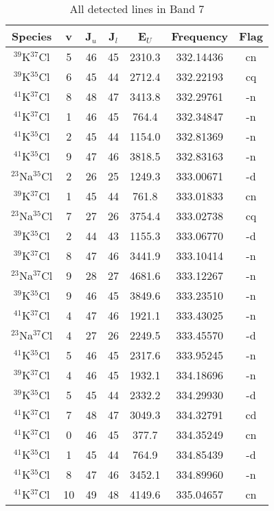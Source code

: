 \begin{table*}[htp]
\centering
\caption{All detected lines in Band 7}
\begin{tabular}{ccccccc}
\label{tab:all_detections_B7}
Species & v & J$_u$ & J$_l$ & E$_U$ & Frequency & Flag \\
\hline
$^{39}$K$^{37}$Cl & 5 & 46 & 45 & 2310.3 & 332.14436 & cn \\
$^{39}$K$^{35}$Cl & 6 & 45 & 44 & 2712.4 & 332.22193 & cq \\
$^{41}$K$^{37}$Cl & 8 & 48 & 47 & 3413.8 & 332.29761 & -n \\
$^{41}$K$^{37}$Cl & 1 & 46 & 45 & 764.4 & 332.34847 & -n \\
$^{41}$K$^{35}$Cl & 2 & 45 & 44 & 1154.0 & 332.81369 & -n \\
$^{41}$K$^{35}$Cl & 9 & 47 & 46 & 3818.5 & 332.83163 & -n \\
$^{23}$Na$^{35}$Cl & 2 & 26 & 25 & 1249.3 & 333.00671 & -d \\
$^{39}$K$^{37}$Cl & 1 & 45 & 44 & 761.8 & 333.01833 & cn \\
$^{23}$Na$^{35}$Cl & 7 & 27 & 26 & 3754.4 & 333.02738 & cq \\
$^{39}$K$^{35}$Cl & 2 & 44 & 43 & 1155.3 & 333.06770 & -d \\
$^{39}$K$^{37}$Cl & 8 & 47 & 46 & 3441.9 & 333.10414 & -n \\
$^{23}$Na$^{37}$Cl & 9 & 28 & 27 & 4681.6 & 333.12267 & -n \\
$^{39}$K$^{35}$Cl & 9 & 46 & 45 & 3849.6 & 333.23510 & -n \\
$^{41}$K$^{37}$Cl & 4 & 47 & 46 & 1921.1 & 333.43025 & -n \\
$^{23}$Na$^{37}$Cl & 4 & 27 & 26 & 2249.5 & 333.45570 & -d \\
$^{41}$K$^{35}$Cl & 5 & 46 & 45 & 2317.6 & 333.95245 & -n \\
$^{39}$K$^{37}$Cl & 4 & 46 & 45 & 1932.1 & 334.18696 & -n \\
$^{39}$K$^{35}$Cl & 5 & 45 & 44 & 2332.2 & 334.29930 & -d \\
$^{41}$K$^{37}$Cl & 7 & 48 & 47 & 3049.3 & 334.32791 & cd \\
$^{41}$K$^{37}$Cl & 0 & 46 & 45 & 377.7 & 334.35249 & cn \\
$^{41}$K$^{35}$Cl & 1 & 45 & 44 & 764.9 & 334.85439 & -d \\
$^{41}$K$^{35}$Cl & 8 & 47 & 46 & 3452.1 & 334.89960 & -n \\
$^{41}$K$^{37}$Cl & 10 & 49 & 48 & 4149.6 & 335.04657 & cn \\

\end{tabular}
\end{table*}
